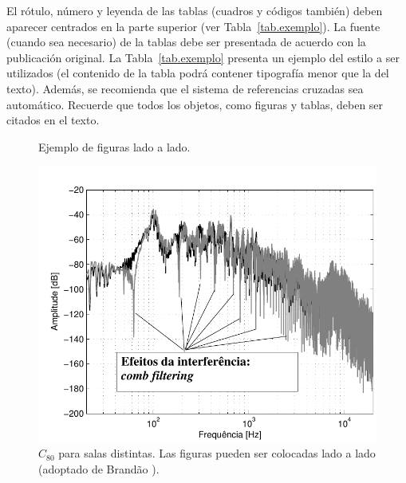 \documentclass[12pt, a4paper, twoside, twocolumn]{article}
\begin{document}
El rótulo, número y leyenda de las tablas (cuadros y códigos también) deben aparecer centrados en la parte superior (ver Tabla~\ref{tab.exemplo}). La fuente (cuando sea necesario) de la tablas debe ser presentada de acuerdo con la publicación original. La Tabla~\ref{tab.exemplo} presenta un ejemplo del estilo a ser utilizados (el contenido de la tabla podrá contener tipografía menor que la del texto). Además, se recomienda que el sistema de referencias cruzadas sea automático. Recuerde que todos los objetos, como figuras y tablas, deben ser citados en el texto.


\begin{figure}[H]
  \centering
	\qquad
  \caption{Ejemplo de figuras lado a lado.}
  \label{subfig.exemplo}
\end{figure}

\begin{figure}[ht!]
	\centering \vspace{-3mm}
        \includegraphics[width=0.98\linewidth,page=1]{figs/Combfilter-Brandao-2017.pdf}
        \caption{$C_{80}$ para salas distintas. Las figuras pueden ser colocadas lado a lado (adoptado de Brandão \cite{Brandao-2017}).}
	\label{fig:C80}%
\end{figure}
\end{document}
